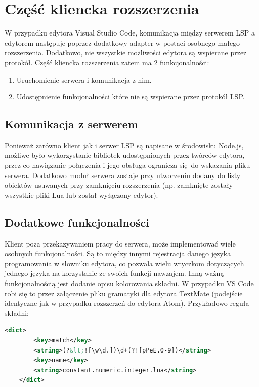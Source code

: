 \chapter{Część kliencka rozszerzenia}
W przypadku edytora Visual Studio Code, komunikacja między serwerem LSP a edytorem następuje poprzez dodatkowy adapter w postaci osobnego małego rozszerzenia. Dodatkowo, nie wszystkie możliwości edytora są wspierane przez protokół. Część kliencka rozszerzenia zatem ma 2 funkcjonalności:

\begin{enumerate}
    \item Uruchomienie serwera i komunikacja z nim.
    \item Udostępnienie funkcjonalności które nie są wspierane przez protokół LSP.
\end{enumerate}

\section{Komunikacja z serwerem}
Ponieważ zarówno klient jak i serwer LSP są napisane w środowisku Node.js, możliwe było wykorzystanie bibliotek udostępnionych przez twórców edytora, przez co nawiązanie połączenia i jego obsługa ogranicza się do wskazania pliku serwera. Dodatkowo moduł serwera zostaje przy utworzeniu dodany do listy obiektów usuwanych przy zamknięciu rozszerzenia (np. zamknięte zostały wszystkie pliki Lua lub został wyłączony edytor).

\section{Dodatkowe funkcjonalności}
Klient poza przekazywaniem pracy do serwera, może implementować wiele osobnych funkcjonalności. Są to między innymi rejestracja danego języka programowania w słowniku edytora, co pozwala wielu wtyczkom dotyczących jednego języka na korzystanie ze swoich funkcji nawzajem. Inną ważną funkcjonalnością jest dodanie opisu kolorowania składni. W przypadku VS Code robi się to przez załączenie pliku gramatyki dla edytora TextMate (podejście identyczne jak w przypadku rozszerzeń do edytora Atom). Przykładowo reguła składni:
\pagebreak

\begin{lstlisting}[language=XML, morekeywords={dict,key,string}]
    <dict>
        <key>match</key>
        <string>(?&lt;![\w\d.])\d+(?![pPeE.0-9])</string>
        <key>name</key>
        <string>constant.numeric.integer.lua</string>
    </dict>
\end{lstlisting}

